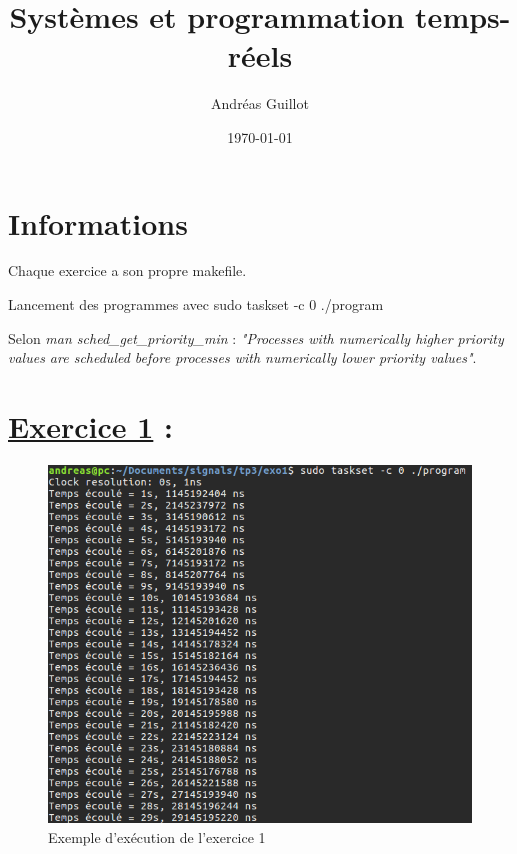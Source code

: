 \documentclass{article}
\title{Systèmes et programmation temps-réels}
\author{Andréas Guillot}
\date{\today}
\begin{document}
\maketitle


\section*{Informations}

Chaque exercice a son propre makefile.

Lancement des programmes avec sudo taskset -c 0 ./program

Selon \textit{man sched\_get\_priority\_min} : \textit{"Processes with numerically higher priority values are scheduled before processes with numerically lower priority values"}.

\section*{\underline{Exercice 1} :}

\begin{figure}
  \includegraphics[width=\linewidth]{exo1.png}
  \caption{Exemple d'exécution de l'exercice 1}
  \label{fig:exo1}
\end{figure}
\end{document}

